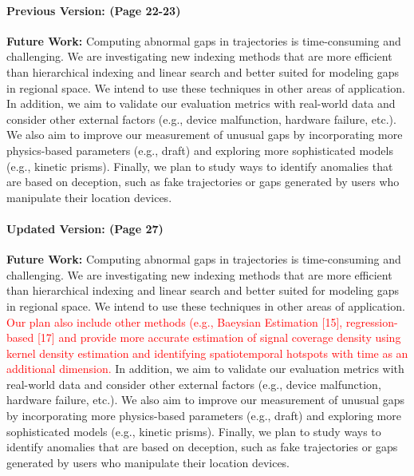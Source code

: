 \documentclass[twoside,leqno,onecolumn]{article}
\begin{document}
\paragraph{Previous Version: (Page 22-23)\\ }
\textbf{Future Work:} Computing abnormal gaps in trajectories is time-consuming and challenging. We are investigating new indexing methods that are more efficient than hierarchical indexing and linear search and better suited for modeling gaps in regional space. We intend to use these techniques in other areas of application. In addition, we aim to validate our evaluation metrics with real-world data and consider other external factors (e.g., device malfunction, hardware failure, etc.). We also aim to improve our measurement of unusual gaps by incorporating more physics-based parameters (e.g., draft) and exploring more sophisticated models (e.g., kinetic prisms). Finally, we plan to study ways to identify anomalies that are based on deception, such as fake trajectories or gaps generated by users who manipulate their location devices.\\

\paragraph{Updated Version: (Page 27)\\ }
\textbf{Future Work:} Computing abnormal gaps in trajectories is time-consuming and challenging. We are investigating new indexing methods that are more efficient than hierarchical indexing and linear search and better suited for modeling gaps in regional space. We intend to use these techniques in other areas of application. \textcolor{red}{Our plan also include other methods (e.g., Baeysian Estimation [15], regression-based [17] and provide more accurate estimation of signal coverage density using kernel density estimation and identifying spatiotemporal hotspots with time as an additional dimension.} In addition, we aim to validate our evaluation metrics with real-world data and consider other external factors (e.g., device malfunction, hardware failure, etc.). We also aim to improve our measurement of unusual gaps by incorporating more physics-based parameters (e.g., draft) and exploring more sophisticated models (e.g., kinetic prisms). Finally, we plan to study ways to identify anomalies that are based on deception, such as fake trajectories or gaps generated by users who manipulate their location devices.
\\

% 
% 
\end{document}
